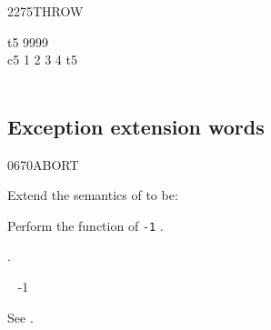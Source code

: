 \begin{worddef}{2275}{THROW}
\begin{testing}
		\word{:} t5   9999  \word{;} \\
		\word{:} c5 1 2 3 4 \word{[']} t5  \tab[4.5]   \\
		\tab {}      \word{;} \tab {}  \\
	\end{testing}
\end{worddef}

\newpage
\subsection{Exception extension words} %
\extended

\begin{worddef}{0670}{ABORT}
\item Extend the semantics of  to be:


	Perform the function of \texttt{-1} .

\see {}.

	\begin{implement} %
		\word{:}  ~ -1  ~ \word{;}
	\end{implement}

	\begin{testing} %
		See .
	\end{testing}
\end{worddef}


